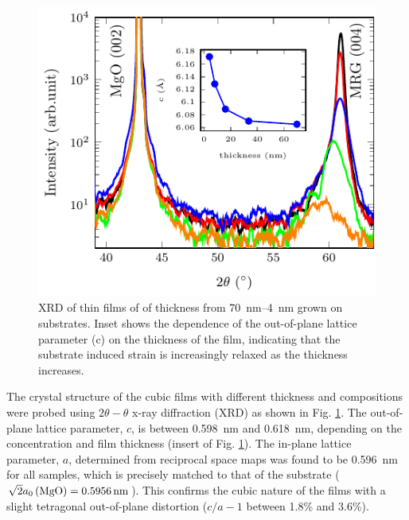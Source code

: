 \documentclass[reprint,aip,apl,floatfix,linenumbers,superscriptaddress]{revtex4-1}
\begin{document}
\begin{figure}
\includegraphics[width=1.0\columnwidth]{Transport-Fig0.pdf}
\caption{XRD of thin films of  of thickness from \SIrange{70}{4}{\nano\metre} grown on  substrates. Inset shows the dependence of the out-of-plane lattice parameter (c) on the thickness of the film, indicating that the substrate induced strain is increasingly relaxed as the thickness increases.}
\label{fig:xrd}
\end{figure}

The crystal structure of the cubic  films with different thickness and compositions were probed using $2\theta-\theta$ x-ray diffraction (XRD) as shown in Fig. \ref{fig:xrd}. The out-of-plane lattice parameter, $c$, is between \SI{0.598}{\nano\metre} and \SI{0.618}{\nano\metre}, depending on the  concentration and film thickness (insert of Fig. \ref{fig:xrd}). The in-plane lattice parameter, $a$, determined from reciprocal space maps was found to be \SI{0.596}{\nano\metre} for all samples, which is precisely matched to that of the  substrate ($\sqrt{2} a_0\left(\ce{MgO} \right) = \SI{0.5956}{\nano\metre}$). This confirms the cubic nature of the  films with a slight tetragonal out-of-plane distortion ($c/a-1$ between \num{1.8}\% and \num{3.6}\%).
\end{document}
